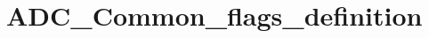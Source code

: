 \hypertarget{group___a_d_c___common__flags__definition}{\section{A\-D\-C\-\_\-\-Common\-\_\-flags\-\_\-definition}
\label{group___a_d_c___common__flags__definition}
}
